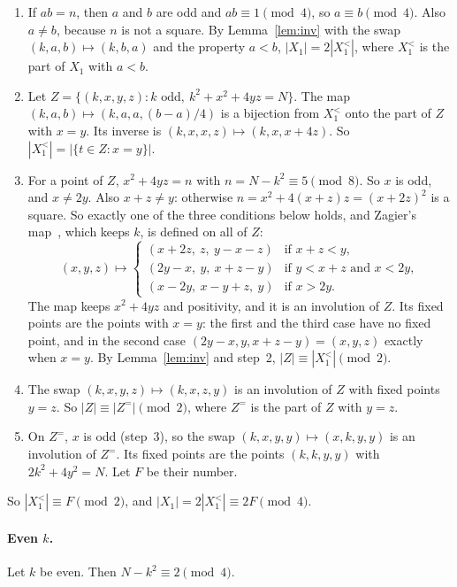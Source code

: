 \documentclass[11pt]{article}
\theoremstyle{remark}
\begin{document}
\begin{enumerate}
\item If $ab=n$, then $a$ and $b$ are odd and $ab\equiv 1\pmod 4$, so $a\equiv b\pmod 4$. Also $a\ne b$, because $n$ is not a square. By Lemma~\ref{lem:inv} with the swap $(k,a,b)\mapsto(k,b,a)$ and the property $a<b$, $|X_1|=2|X_1^<|$, where $X_1^<$ is the part of $X_1$ with $a<b$.
\item Let $Z=\{(k,x,y,z): k \text{ odd},\ k^2+x^2+4yz=N\}$. The map $(k,a,b)\mapsto(k,a,a,(b-a)/4)$ is a bijection from $X_1^<$ onto the part of $Z$ with $x=y$. Its inverse is $(k,x,x,z)\mapsto(k,x,x+4z)$. So $|X_1^<|=|\{t\in Z: x=y\}|$.
\item For a point of $Z$, $x^2+4yz=n$ with $n=N-k^2\equiv 5\pmod 8$. So $x$ is odd, and $x\ne 2y$. Also $x+z\ne y$: otherwise $n=x^2+4(x+z)z=(x+2z)^2$ is a square. So exactly one of the three conditions below holds, and Zagier's map~\cite{Zagier}, which keeps $k$, is defined on all of $Z$:
\[
(x,y,z)\mapsto
\begin{cases}
(x+2z,\ z,\ y-x-z) & \text{if } x+z<y,\\
(2y-x,\ y,\ x+z-y) & \text{if } y<x+z \text{ and } x<2y,\\
(x-2y,\ x-y+z,\ y) & \text{if } x>2y.
\end{cases}
\]
The map keeps $x^2+4yz$ and positivity, and it is an involution of $Z$. Its fixed points are the points with $x=y$: the first and the third case have no fixed point, and in the second case $(2y-x,y,x+z-y)=(x,y,z)$ exactly when $x=y$. By Lemma~\ref{lem:inv} and step~2, $|Z|\equiv|X_1^<|\pmod 2$.
\item The swap $(k,x,y,z)\mapsto(k,x,z,y)$ is an involution of $Z$ with fixed points $y=z$. So $|Z|\equiv|Z^{=}|\pmod 2$, where $Z^{=}$ is the part of $Z$ with $y=z$.
\item On $Z^{=}$, $x$ is odd (step~3), so the swap $(k,x,y,y)\mapsto(x,k,y,y)$ is an involution of $Z^{=}$. Its fixed points are the points $(k,k,y,y)$ with $2k^2+4y^2=N$. Let $F$ be their number.
\end{enumerate}
So $|X_1^<|\equiv F\pmod 2$, and $|X_1|=2|X_1^<|\equiv 2F\pmod 4$.

\paragraph{Even $k$.} Let $k$ be even. Then $N-k^2\equiv 2\pmod 4$.
\end{document}
